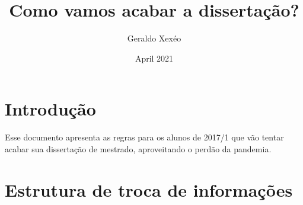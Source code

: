 \documentclass{article}
\title{Como vamos acabar a dissertação?}
\author{Geraldo Xexéo}
\date{April 2021}
\begin{document}
\maketitle

\section{Introdução}

Esse documento apresenta as regras para os alunos de 2017/1 que vão tentar acabar sua dissertação de mestrado, aproveitando o perdão da pandemia.

\section{Estrutura de troca de informações}
\end{document}
